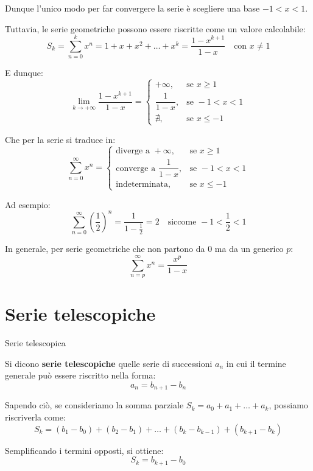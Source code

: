 \documentclass[12pt]{report}
\begin{document}
	Dunque l'unico modo per far convergere la serie è scegliere una base $-1 < x < 1$.
	
	Tuttavia, le serie geometriche possono essere riscritte come un valore calcolabile:
	\[
	S_k = \sum_{n=0}^{k} x^n = 1 + x + x^2 + \dots + x^k = \frac{1 - x^{k+1}}{1 - x} \quad \text{con } x \neq 1
	\]
	
	E dunque:
	\[
	\lim_{k \to +\infty} \frac{1 - x^{k+1}}{1 - x} = 
	\begin{cases}
		+\infty, & \text{se } x \ge 1 \\
		\dfrac{1}{1 - x}, & \text{se } -1 < x < 1 \\
		\nexists, & \text{se } x \le -1
	\end{cases}
	\]
	
	Che per la serie si traduce in:
	\[
	\sum_{n=0}^{\infty} x^n = 
	\begin{cases}
		\text{diverge a } +\infty, & \text{se } x \ge 1 \\
		\text{converge a } \dfrac{1}{1 - x}, & \text{se } -1 < x < 1 \\
		\text{indeterminata}, & \text{se } x \le -1
	\end{cases}
	\]
	
	Ad esempio:
	\[
	\sum_{n=0}^{\infty} \left(\frac{1}{2}\right)^n = \frac{1}{1 - \frac{1}{2}} = 2 \quad \text{siccome } -1 < \frac{1}{2} < 1
	\]
	
	In generale, per serie geometriche che non partono da $0$ ma da un generico $p$:
	\[
	\sum_{n=p}^{\infty} x^n = \frac{x^p}{1 - x}
	\]
	
	\section{Serie telescopiche}
	
	\begin{definizione}{Serie telescopica}{}
		
		Si dicono \textbf{serie telescopiche} quelle serie di successioni $a_n$ in cui il termine generale può essere riscritto nella forma:
		\[
		a_n = b_{n+1} - b_n
		\]
		
	\end{definizione}
	
	Sapendo ciò, se consideriamo la somma parziale $S_k = a_0 + a_1 + \dots + a_k$, possiamo riscriverla come:
	\[
	S_k = (b_1 - b_0) + (b_2 - b_1) + \dots + (b_k - b_{k-1}) + (b_{k+1} - b_k)
	\]
	
	Semplificando i termini opposti, si ottiene:
	\[
	S_k = b_{k+1} - b_0
	\]
	
\end{document}
